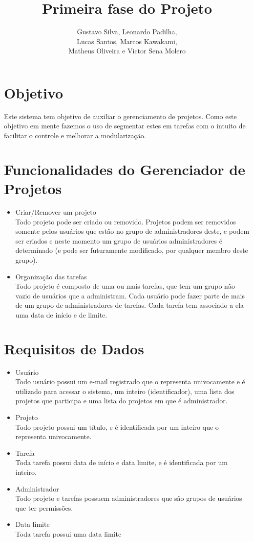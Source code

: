 \documentclass{article}
\title{Primeira fase do Projeto}
\author{Gustavo Silva, Leonardo Padilha, \\Lucas Santos, Marcos Kawakami, \\Matheus Oliveira e Victor Sena Molero}
\date{}
\begin{document}
\maketitle

\section{Objetivo}
Este sistema tem objetivo de auxiliar o gerenciamento de projetos. Como este objetivo em mente fazemos o uso de segmentar estes em tarefas com o intuito de facilitar o controle e melhorar a modularização.

\section{Funcionalidades do Gerenciador de Projetos}
\begin{itemize}
    \item Criar/Remover um projeto
    \\Todo projeto pode ser criado ou removido. Projetos podem ser removidos somente pelos usuários que estão no grupo de administradores deste, e podem ser criados e neste momento um grupo de usuários administradores é determinado (e pode ser futuramente modificado, por qualquer membro deste grupo).
    \item Organização das tarefas
    \\Todo projeto é composto de uma ou mais tarefas, que tem um grupo não vazio de usuários que a administram. Cada usuário pode fazer parte de mais de um grupo de administradores de tarefas. Cada tarefa tem associado a ela uma data de início e de limite.
\end{itemize}

\section{Requisitos de Dados}
\begin{itemize}
    \item Usuário
    \\ Todo usuário possui um e-mail registrado que o representa univocamente e é utilizado para acessar o sistema, um inteiro (identificador), uma lista dos projetos que participa e uma lista do projetos em que é administrador.
    \item Projeto
    \\Todo projeto possui um título, e é identificada por um inteiro que o representa univocamente.
    \item Tarefa
    \\Toda tarefa possui data de início e data limite, e é identificada por um inteiro.
    \item Administrador
    \\Todo projeto e tarefas possuem administradores que são grupos de usuários que ter permissões.
    \item Data limite
    \\Toda tarefa possui uma data limite
\end{itemize}
\end{document}
